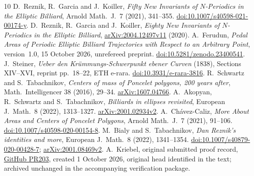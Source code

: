 \documentclass[11pt]{article}
\begin{document}
\begin{thebibliography}{10}
 D.~Reznik, R.~Garcia and J.~Koiller,
\emph{Fifty New Invariants of \(N\)-Periodics in the Elliptic Billiard},
Arnold Math.~J.~7 (2021), 341--355.
\href{https://doi.org/10.1007/s40598-021-00174-y}{doi:10.1007/s40598-021-00174-y}.
 D.~Reznik, R.~Garcia and J.~Koiller,
\emph{Eighty New Invariants of \(N\)-Periodics in the Elliptic Billiard},
\href{https://arxiv.org/abs/2004.12497v11}{arXiv:2004.12497v11} (2020).
 A.~Ferudun,
\emph{Pedal Areas of Periodic Elliptic Billiard Trajectories with
Respect to an Arbitrary Point}, version~1.0, 15 October 2026,
unrefereed preprint.
\href{https://doi.org/10.5281/zenodo.23400541}{doi:10.5281/zenodo.23400541}.
 J.~Steiner,
\emph{Ueber den Kr\"ummungs-Schwerpunkt ebener Curven} (1838),
Sections XIV--XVI, reprint pp.~18--22, ETH e-rara.
\href{https://doi.org/10.3931/e-rara-3816}{doi:10.3931/e-rara-3816}.
 R.~Schwartz and S.~Tabachnikov,
\emph{Centers of mass of Poncelet polygons, 200 years after},
Math.~Intelligencer 38 (2016), 29--34.
\href{https://arxiv.org/abs/1607.04766}{arXiv:1607.04766}.
 A.~Akopyan, R.~Schwartz and S.~Tabachnikov,
\emph{Billiards in ellipses revisited}, European J.~Math.~8 (2022),
1313--1327.
\href{https://arxiv.org/abs/2001.02934v2}{arXiv:2001.02934v2}.
 A.~Ch\'avez-Caliz,
\emph{More About Areas and Centers of Poncelet Polygons},
Arnold Math.~J.~7 (2021), 91--106.
\href{https://doi.org/10.1007/s40598-020-00154-8}{doi:10.1007/s40598-020-00154-8}.
 M.~Bialy and S.~Tabachnikov,
\emph{Dan Reznik's identities and more}, European J.~Math.~8 (2022),
1341--1354.
\href{https://doi.org/10.1007/s40879-020-00428-7}{doi:10.1007/s40879-020-00428-7};
\href{https://arxiv.org/abs/2001.08469v2}{arXiv:2001.08469v2}.
 A.~Kriebel, original submitted proof record,
\href{https://github.com/AlecKriebel/Math/pull/203}{GitHub PR203},
created 1 October 2026, original head identified in the text;
archived unchanged in the accompanying verification package.
\end{thebibliography}
\end{document}
